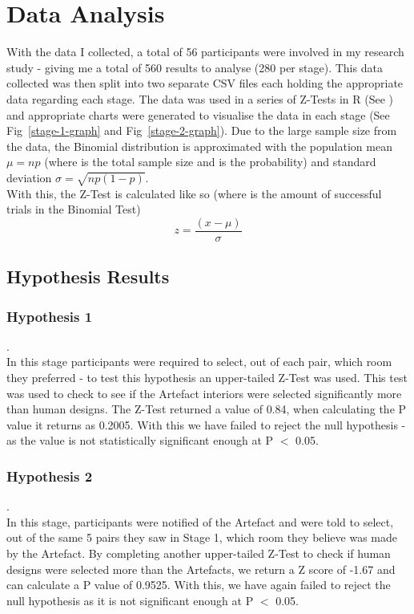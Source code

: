 \section{Data Analysis}
With the data I collected, a total of 56 participants were involved in my research study - giving me a total of 560 results to analyse (280 per stage). This data collected was then split into two separate CSV files each holding the appropriate data regarding each stage. The data was used in a series of Z-Tests in R (See \hyperref[append:g]{}) and appropriate charts were generated to visualise the data in each stage (See Fig~\ref{stage-1-graph} and Fig~\ref{stage-2-graph}).
Due to the large sample size from the data, the Binomial distribution is approximated with the population mean \(\mu = np\) (where  is the total sample size and  is the probability) and standard deviation \(\sigma = \sqrt{np(1-p)}\).
\\
With this, the Z-Test is calculated like so (where  is the amount of successful trials in the Binomial Test) \cite[Chapter~6]{zar-jerrold}
\[z = \frac{(x - \mu ) }{\sigma }\]

\subsection{Hypothesis Results}
\subsubsection{Hypothesis 1}
.\\
In this stage participants were required to select, out of each pair, which room they preferred - to test this hypothesis an upper-tailed Z-Test was used.
This test was used to check to see if the Artefact interiors were selected significantly more than human designs. The Z-Test returned a value of 0.84, when calculating the P value it returns as 0.2005. With this we have failed to reject the null hypothesis - as the value is not statistically significant enough at P $<$ 0.05.
\\
\subsubsection{Hypothesis 2}
.\\
In this stage, participants were notified of the Artefact and were told to select, out of the same 5 pairs they saw in Stage 1, which room they believe was made by the Artefact. By completing another upper-tailed Z-Test to check if human designs were selected more than the Artefacts, we return a Z score of -1.67 and can calculate a P value of 0.9525. With this, we have again failed to reject the null hypothesis as it is not significant enough at P $<$ 0.05.

